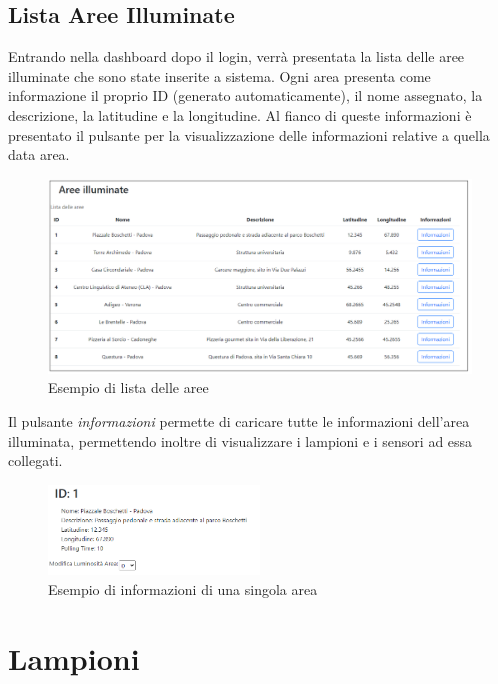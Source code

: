 \documentclass[a4paper, 12pt]{article}
\begin{document}
\subsection{Lista Aree Illuminate}
Entrando nella dashboard dopo il login, verrà presentata la lista delle aree illuminate che sono state inserite a sistema. Ogni area presenta come informazione il proprio ID (generato automaticamente), il nome assegnato, la descrizione, la latitudine e la longitudine. Al fianco di queste informazioni è presentato il pulsante per la visualizzazione delle informazioni relative a quella data area.\\
\begin{figure}[H]
\centering
\includegraphics[width=\textwidth]{ListaAree}
\caption{Esempio di lista delle aree}
\end{figure}
Il pulsante \textit{informazioni} permette di caricare tutte le informazioni dell'area illuminata, permettendo inoltre di visualizzare i lampioni e i sensori ad essa collegati.\\
\begin{figure}[H]
\centering
\includegraphics[width=0.5\textwidth]{InfoArea}
\caption{Esempio di informazioni di una singola area}
\end{figure}

\newpage
\section{Lampioni}
\end{document}
